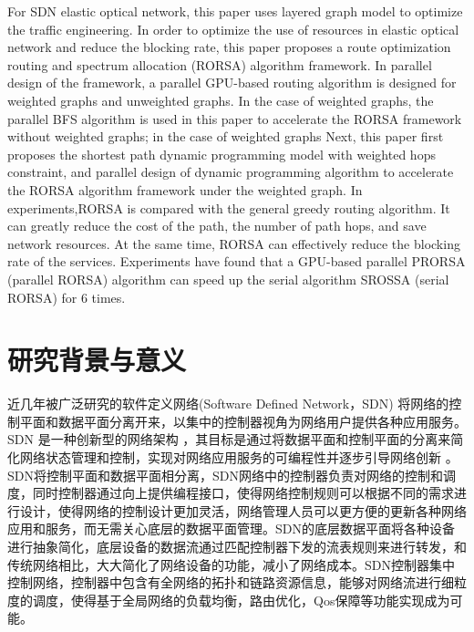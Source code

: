 \documentclass[master]{thesis-uestc}
\begin{document}
\begin{englishabstract}
For SDN elastic optical network, this paper uses layered graph model to optimize the traffic engineering. In order to optimize the use of resources in elastic optical network and reduce the blocking rate, this paper proposes a route optimization routing and spectrum allocation (RORSA) algorithm framework. In parallel design of the framework, a parallel GPU-based routing algorithm is designed for weighted graphs and unweighted graphs. In the case of weighted graphs, the parallel BFS algorithm is used in this paper to accelerate the RORSA framework without weighted graphs; in the case of weighted graphs Next, this paper first proposes the shortest path dynamic programming model with weighted hops constraint, and parallel design of dynamic programming algorithm to accelerate the RORSA algorithm framework under the weighted graph. In experiments,RORSA is compared with the general greedy routing algorithm. It can greatly reduce the cost of the path, the number of path hops, and save network resources. At the same time, RORSA can effectively reduce the blocking rate of the services. Experiments have found that a GPU-based parallel PRORSA (parallel RORSA) algorithm can speed up the serial algorithm SROSSA (serial RORSA) for 6 times.


\end{englishabstract}
\thesistableofcontents
\thesisfigurelist
\thesistablelist
\thesischapterexordium
\section{研究背景与意义}
近几年被广泛研究的软件定义网络(Software Defined Network，SDN) \cite{OpenFlow} \cite{SDN}将网络的控制平面和数据平面分离开来，以集中的控制器视角为网络用户提供各种应用服务。SDN 是一种创新型的网络架构 \cite{SDN2}，其目标是通过将数据平面和控制平面的分离来简化网络状态管理和控制，实现对网络应用服务的可编程性并逐步引导网络创新 \cite{SDN3}。SDN将控制平面和数据平面相分离，SDN网络中的控制器负责对网络的控制和调度，同时控制器通过向上提供编程接口，使得网络控制规则可以根据不同的需求进行设计，使得网络的控制设计更加灵活，网络管理人员可以更方便的更新各种网络应用和服务，而无需关心底层的数据平面管理。SDN的底层数据平面将各种设备进行抽象简化，底层设备的数据流通过匹配控制器下发的流表规则来进行转发，和传统网络相比，大大简化了网络设备的功能，减小了网络成本。SDN控制器集中控制网络，控制器中包含有全网络的拓扑和链路资源信息，能够对网络流进行细粒度的调度，使得基于全局网络的负载均衡，路由优化，Qos保障等功能实现成为可能。
\end{document}
